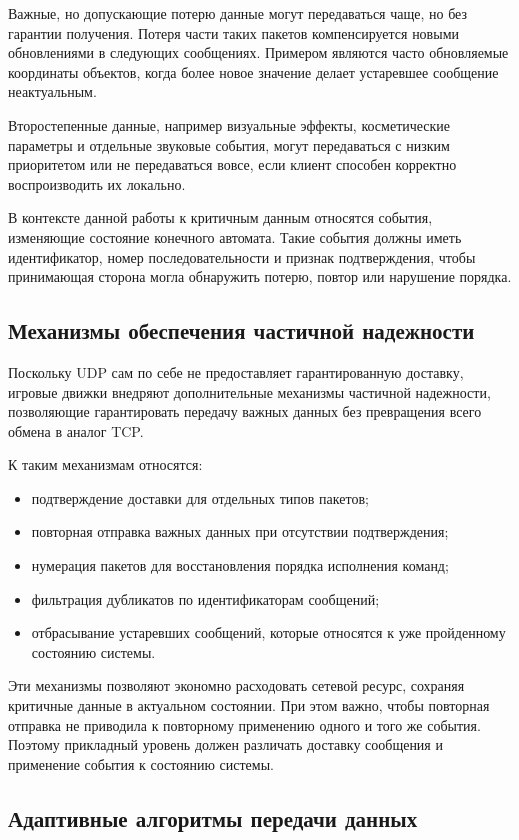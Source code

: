 Важные, но допускающие потерю данные могут передаваться чаще, но без гарантии получения. Потеря части таких пакетов компенсируется новыми обновлениями в следующих сообщениях. Примером являются часто обновляемые координаты объектов, когда более новое значение делает устаревшее сообщение неактуальным.

Второстепенные данные, например визуальные эффекты, косметические параметры и отдельные звуковые события, могут передаваться с низким приоритетом или не передаваться вовсе, если клиент способен корректно воспроизводить их локально.

В контексте данной работы к критичным данным относятся события, изменяющие состояние конечного автомата. Такие события должны иметь идентификатор, номер последовательности и признак подтверждения, чтобы принимающая сторона могла обнаружить потерю, повтор или нарушение порядка.

\subsection{Механизмы обеспечения частичной надежности}

Поскольку UDP сам по себе не предоставляет гарантированную доставку, игровые движки внедряют дополнительные механизмы частичной надежности, позволяющие гарантировать передачу важных данных без превращения всего обмена в аналог TCP.

К таким механизмам относятся:
\begin{itemize}
	\item подтверждение доставки для отдельных типов пакетов;
	\item повторная отправка важных данных при отсутствии подтверждения;
	\item нумерация пакетов для восстановления порядка исполнения команд;
	\item фильтрация дубликатов по идентификаторам сообщений;
	\item отбрасывание устаревших сообщений, которые относятся к уже пройденному состоянию системы.
\end{itemize}

Эти механизмы позволяют экономно расходовать сетевой ресурс, сохраняя критичные данные в актуальном состоянии. При этом важно, чтобы повторная отправка не приводила к повторному применению одного и того же события. Поэтому прикладный уровень должен различать доставку сообщения и применение события к состоянию системы.

\subsection{Адаптивные алгоритмы передачи данных}

